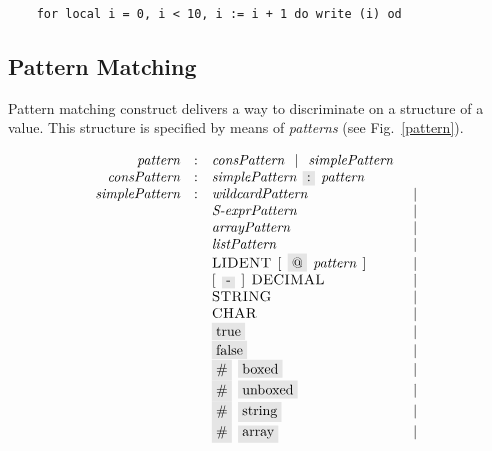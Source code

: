 \begin{lstlisting}
    for local i = 0, i < 10, i := i + 1 do write (i) od
\end{lstlisting}

\subsection{Pattern Matching}

Pattern matching construct delivers a way to discriminate on a structure of a value. This structure is specified by
means of \emph{patterns} (see Fig.~\ref{pattern}). 

\begin{figure}[t]
  \[
    \begin{array}{rcll}
      \defterm{pattern}         & : & \nonterm{consPattern}\alt\nonterm{simplePattern}&\\
      \defterm{consPattern}     & : & \nonterm{simplePattern}\s\term{:}\s\nonterm{pattern}&\\
      \defterm{simplePattern}   & : & \nonterm{wildcardPattern} & \alt\\
                                &   & \nonterm{S-exprPattern} & \alt \\
                                &   & \nonterm{arrayPattern} & \alt \\
                                &   & \nonterm{listPattern} & \alt \\
                                &   & \token{LIDENT}\s[\s\term{@}\s\nonterm{pattern} \s] & \alt \\
                                &   & [\s\term{-}\s]\s\token{DECIMAL}& \alt \\
                                &   & \token{STRING} & \alt \\
                                &   & \token{CHAR} & \alt \\
                                &   & \term{true} & \alt \\
                                &   & \term{false} & \alt \\
                                &   & \term{\#}\s\term{boxed} & \alt \\
                                &   & \term{\#}\s\term{unboxed} & \alt \\
                                &   & \term{\#}\s\term{string} & \alt \\
                                &   & \term{\#}\s\term{array} & \alt \\

\end{array}\]
\end{figure}
